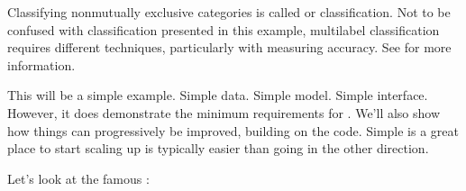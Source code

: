 \documentclass[letterpaper,10pt,english]{jupyterBook}
\begin{document}
\begin{sphinxShadowBox}
\sphinxstylesidebartitle{}

\sphinxAtStartPar
Classifying non\sphinxhyphen{}mutually exclusive categories is called  or  classification. Not to be confused with  classification presented in this example, multi\sphinxhyphen{}label classification requires different techniques, particularly with measuring accuracy. See  for more information.
\end{sphinxShadowBox}

\sphinxAtStartPar
This will be a simple example. Simple data. Simple model. Simple interface. However, it does demonstrate the minimum requirements for . We’ll also show how things can progressively be improved, building on the  code. Simple is a great place to start \sphinxhyphen{}scaling up is typically easier than going in the other direction.



\sphinxAtStartPar
Let’s look at the famous :
\end{document}
